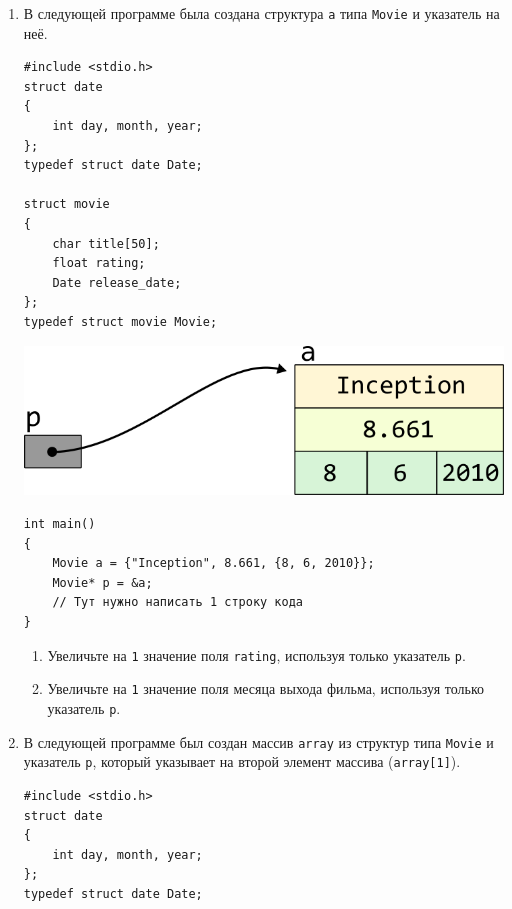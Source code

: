 \documentclass{article}
\begin{document}
\begin{enumerate}
\newpage


\item В следующей программе была создана структура \texttt{a} типа \texttt{Movie} и указатель на неё.
\begin{multicols}{2}
\begin{lstlisting}
#include <stdio.h>
struct date 
{
    int day, month, year;
};
typedef struct date Date;

struct movie 
{
    char title[50];
    float rating;
    Date release_date;
};
typedef struct movie Movie;
\end{lstlisting}

\vfill \null  
\columnbreak
\vfill \null  

\begin{center}
\includegraphics[scale=1]{../images/pointer_schemes/pointer_to_struct_movie.png}
\end{center}
\end{multicols}

\vspace{-10ex}
\begin{lstlisting}
int main() 
{
    Movie a = {"Inception", 8.661, {8, 6, 2010}};
    Movie* p = &a;
    // Тут нужно написать 1 строку кода
}
\end{lstlisting}
\begin{enumerate}
\item Увеличьте на \texttt{1} значение поля \texttt{rating}, используя только указатель \texttt{p}.
\item Увеличьте на \texttt{1} значение поля месяца выхода фильма, используя только указатель \texttt{p}.
\end{enumerate}





\item В следующей программе был создан массив \texttt{array} из структур типа \texttt{Movie} и указатель \texttt{p}, который указывает на второй элемент массива (\texttt{array[1]}).
\begin{lstlisting}
#include <stdio.h>
struct date 
{
    int day, month, year;
};
typedef struct date Date;


\end{lstlisting}
\end{enumerate}
\end{document}
